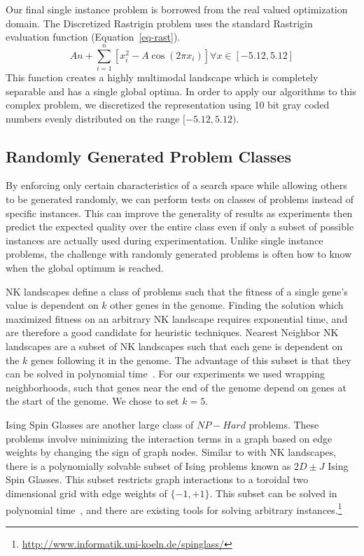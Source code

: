 \documentclass{sig-alternate}
\begin{document}
Our final single instance problem is borrowed from the real valued optimization domain.
The Discretized Rastrigin problem uses the standard Rastrigin evaluation function (Equation~\ref{eq-rast}).
\begin{equation}
  An + \sum_{i=1}^{n}\left [ x_i^2-A\cos (2\pi x_i) \right ] \forall x\in [-5.12,5.12]
  \label{eq-rast}
\end{equation}
This function creates a highly multimodal landscape which is completely separable
and has a single global optima.  In order to apply our algorithms to this complex problem,
we discretized the representation using 10 bit gray coded numbers evenly distributed
on the range $[-5.12,5.12)$.

\subsection{Randomly Generated Problem Classes}
By enforcing only certain characteristics of a search space while allowing others
to be generated randomly, we can perform tests on classes of problems instead
of specific instances.  This can improve the generality of results as experiments
then predict the expected quality over the entire class even if only a subset
of possible instances are actually used during experimentation.  Unlike single
instance problems, the challenge with randomly generated problems is often how
to know when the global optimum is reached.

NK landscapes define a class of problems such that the fitness of a single gene's
value is dependent on $k$ other genes in the genome.  Finding the solution which
maximized fitness on an arbitrary NK landscape requires exponential time, and
are therefore a good candidate for heuristic techniques.  Nearest Neighbor NK
landscapes are a subset of NK landscapes such that each gene is dependent on the $k$
genes following it in the genome.  The advantage of this subset is that they can be
solved in polynomial time~\cite{wright:2000:solvingnk}.  For our experiments we
used wrapping neighborhoods, such that genes near the end of the genome depend on
genes at the start of the genome.  We chose to set $k=5$.

Ising Spin Glasses are another large class of $NP-Hard$ problems.  These problems
involve minimizing the interaction terms in a graph based on edge weights by changing
the sign of graph nodes.  Similar to with NK landscapes, there is a polynomially solvable subset of Ising problems
known as $2D\pm J$ Ising Spin Glasses.  This subset restricts graph interactions to a
toroidal two dimensional grid with edge weights of $\{-1, +1\}$.  This subset can
be solved in polynomial time~\cite{saul:1994:spinglass}, and there are existing
tools for solving arbitrary instances.\footnote{\url{http://www.informatik.uni-koeln.de/spinglass/}}
\end{document}
